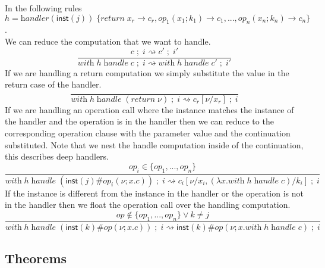 \documentclass[12pt]{article}
\newcommand\op[0]{op}
\newcommand\val[0]{\nu}
\newcommand\vinst[1]{\mathsf{inst}(#1)}
\newcommand\vabs[2]{\lambda #1 . #2}
\newcommand\vhandleri[2]{\textit{handler} ( #1 ) \; \{#2\}}
\newcommand\comp[0]{c}
\newcommand\creturn[1]{\textit{return} \; #1}
\newcommand\copi[5]{#1 \# #2(#3 ; #4 . #5)}
\newcommand\chandle[2]{\textit{with} \; #1 \; \textit{handle} \; #2}
\newcommand\sep[0]{\;;\;}
\begin{document}
In the following rules \\$h = 
	\vhandleri{\vinst{j}}{
		\textit{return} \; x_r \rightarrow \comp_r,
		\op_1(x_1 ; k_1) \rightarrow \comp_1,
		...,
		\op_n(x_n ; k_n) \rightarrow \comp_n
	}$.\\
We can reduce the computation that we want to handle.\\
\[\frac{
	\comp\sep i \rightsquigarrow \comp'\sep i'
}{
	\chandle{h}{\comp}\sep i \rightsquigarrow \chandle{h}{\comp'}\sep i'
}\]
If we are handling a return computation we simply substitute the value in the return case of the handler.\\
\[\frac{
}{
\chandle{h}{(\creturn{\val})}\sep i \rightsquigarrow \comp_r[\val/x_r]\sep i
}\]
If we are handling an operation call where the instance matches the instance of the handler and the operation is in the handler then we can reduce to the corresponding operation clause with the parameter value and the continuation substituted.
Note that we nest the handle computation inside of the continuation, this describes deep handlers.\\
\[\frac{
	\op_i \in \{\op_1, ..., \op_n \}
}{
	\chandle{h}{(\copi{\vinst{j}}{\op_i}{\val}{x}{\comp})}\sep i \rightsquigarrow \comp_i[\val/x_i, (\vabs{x}{\chandle{h}{\comp}})/k_i]\sep i
}\]
If the instance is different from the instance in the handler or the operation is not in the handler then we float the operation
call over the handling computation.\\
\[\frac{
	\op \notin \{\op_1, ..., \op_n \} \lor k \neq j
}{
	\chandle{h}{(\copi{\vinst{k}}{\op}{\val}{x}{\comp})}\sep i \rightsquigarrow \copi{\vinst{k}}{\op}{\val}{x}{\chandle{h}{\comp}}\sep i
}\]

\newpage
\subsection{Theorems}
\end{document}
